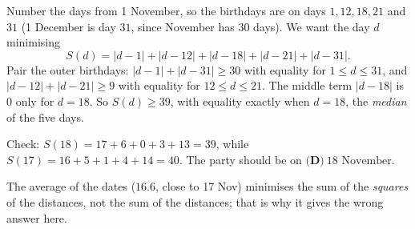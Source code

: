 Number the days from 1 November, so the birthdays are on days $1,12,18,21$ and $31$ (1 December is day $31$, since November has $30$ days). We want the day $d$ minimising
\[
S(d)=|d-1|+|d-12|+|d-18|+|d-21|+|d-31| .
\]
Pair the outer birthdays: $|d-1|+|d-31|\ge30$ with equality for $1\le d\le31$, and $|d-12|+|d-21|\ge9$ with equality for $12\le d\le21$. The middle term $|d-18|$ is $0$ only for $d=18$. So $S(d)\ge39$, with equality exactly when $d=18$, the \emph{median} of the five days.

Check: $S(18)=17+6+0+3+13=39$, while $S(17)=16+5+1+4+14=40$. The party should be on $\boxed{\textbf{(D)}\ \text{18 November}}$.

The average of the dates ($16.6$, close to 17 Nov) minimises the sum of the \emph{squares} of the distances, not the sum of the distances; that is why it gives the wrong answer here.
